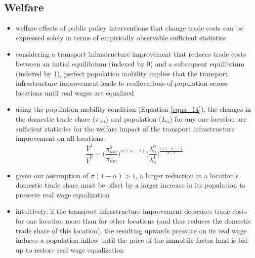 \documentclass[11pt]{article}
\begin{document}
\subsection*{Welfare}
\begin{itemize}
\item welfare effects of public policy interventions that change trade costs can be expressed solely in terms of empirically observable sufficient statistics
\item considering a transport infrastructure improvement that reduces trade costs between an initial equilibrium (indexed by 0) and a subsequent equilibrium (indexed by 1), perfect population mobility implies that the transport infrastructure improvement leads to reallocations of population across locations until real wages are equalized
\item using the population mobility condition (Equation \ref{equa_14}), the changes in the domestic trade share ($\pi_{nn}$) and population ($L_{n}$) for any one location are sufficient statistics for the welfare impact of the transport infrastructure improvement on all locations:
\begin{equation}
\frac{\overline{V}^{1}}{\overline{V}^{0}}  = \Big( \frac{\pi^{0}_{nm}}{\pi^{1}_{nm}} \Big)^{\alpha / (\sigma - 1)} \Big( \frac{\lambda^{0}_{n}}{\lambda^{1}_{n}} \Big)^{\frac{\sigma (1 - \alpha ) - 1}{\sigma - 1}}
\end{equation}
\item given our assumption of $\sigma (1 - \alpha )>1$, a larger reduction in a location’s domestic trade share must be offset by a larger increase in its population to preserve real wage equalization
\item intuitively, if the transport infrastructure improvement decreases trade costs for one location more than for other locations (and thus reduces the domestic trade share of this location), the resulting upwards pressure on its real wage induces a population inflow until the price of the immobile factor land is bid up to restore real wage equalization
\end{itemize}
\end{document}
